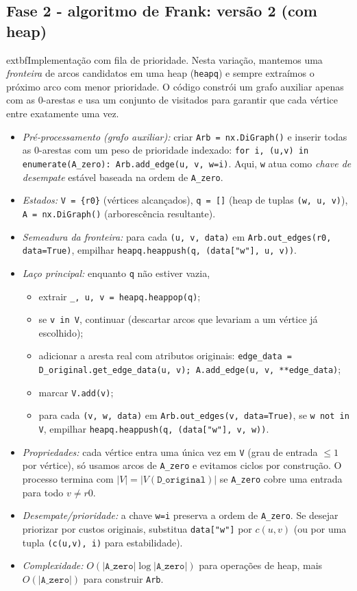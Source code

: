 \subsection{Fase 2 - algoritmo de Frank: versão 2 (com heap)}
extbf{Implementação com fila de prioridade.} Nesta variação, mantemos uma \emph{fronteira} de arcos candidatos em uma heap (\texttt{heapq}) e sempre extraímos o próximo arco com menor prioridade. O código constrói um grafo auxiliar apenas com as 0-arestas e usa um conjunto de visitados para garantir que cada vértice entre exatamente uma vez.
\begin{itemize}\setlength{\itemsep}{1pt}
	\item \emph{Pré-processamento (grafo auxiliar):} criar \texttt{Arb = nx.DiGraph()} e inserir todas as 0-arestas com um peso de prioridade indexado: \texttt{for i, (u,v) in enumerate(A\_zero): Arb.add\_edge(u, v, w=i)}. Aqui, \texttt{w} atua como \emph{chave de desempate} estável baseada na ordem de \texttt{A\_zero}.
	\item \emph{Estados:} \texttt{V = \{r0\}} (vértices alcançados), \texttt{q = []} (heap de tuplas \texttt{(w, u, v)}), \texttt{A = nx.DiGraph()} (arborescência resultante).
	\item \emph{Semeadura da fronteira:} para cada \texttt{(u, v, data)} em \texttt{Arb.out\_edges(r0, data=True)}, empilhar \texttt{heapq.heappush(q, (data["w"], u, v))}.
	\item \emph{Laço principal:} enquanto \texttt{q} não estiver vazia,
	      \begin{itemize}\setlength{\itemsep}{1pt}
		      \item extrair \texttt{\_, u, v = heapq.heappop(q)};
		      \item se \texttt{v in V}, continuar (descartar arcos que levariam a um vértice já escolhido);
		      \item adicionar a aresta real com atributos originais: \texttt{edge\_data = D\_original.get\_edge\_data(u, v); A.add\_edge(u, v, **edge\_data)};
		      \item marcar \texttt{V.add(v)};
		      \item para cada \texttt{(v, w, data)} em \texttt{Arb.out\_edges(v, data=True)}, se \texttt{w not in V}, empilhar \texttt{heapq.heappush(q, (data["w"], v, w))}.
	      \end{itemize}
	\item \emph{Propriedades:} cada vértice entra uma única vez em \texttt{V} (grau de entrada \(\le 1\) por vértice), só usamos arcos de \texttt{A\_zero} e evitamos ciclos por construção. O processo termina com \(|V| = |V(\texttt{D\_original})|\) se \texttt{A\_zero} cobre uma entrada para todo \(v\neq r0\).
	\item \emph{Desempate/prioridade:} a chave \texttt{w=i} preserva a ordem de \texttt{A\_zero}. Se desejar priorizar por custos originais, substitua \texttt{data["w"]} por \(c(u,v)\) (ou por uma tupla \texttt{(c(u,v), i)} para estabilidade).
	\item \emph{Complexidade:} \(O(|\texttt{A\_zero}| \log |\texttt{A\_zero}|)\) para operações de heap, mais \(O(|\texttt{A\_zero}|)\) para construir \texttt{Arb}.
\end{itemize}

